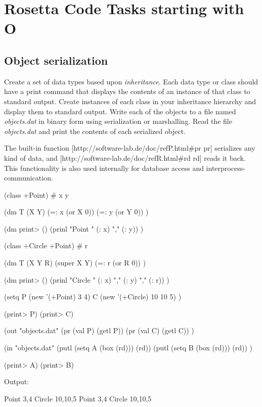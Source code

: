%
%
%

\chapter{Rosetta Code Tasks starting with O}

\section*{Object serialization}


Create a set of data types based upon
\emph{inheritance}. Each data type or class should
have a print command that displays the contents of an instance of that
class to standard output. Create instances of each class in your
inheritance hierarchy and display them to standard output. Write each of
the objects to a file named \emph{objects.dat} in binary form using
serialization or marshalling. Read the file \emph{objects.dat} and print
the contents of each serialized object.

\begin{wideverbatim}

The built-in function [http://software-lab.de/doc/refP.html#pr pr] serializes
any kind of data, and [http://software-lab.de/doc/refR.html#rd rd] reads it
back. This functionality is also used internally for database access and
interprocess-communication.

(class +Point)
# x y

(dm T (X Y)
   (=: x (or X 0))
   (=: y (or Y 0)) )

(dm print> ()
   (prinl "Point " (: x) "," (: y)) )

(class +Circle +Point)
# r

(dm T (X Y R)
   (super X Y)
   (=: r (or R 0)) )

(dm print> ()
   (prinl "Circle " (: x) "," (: y) "," (: r)) )

(setq
   P (new '(+Point) 3 4)
   C (new '(+Circle) 10 10 5) )

(print> P)
(print> C)

(out "objects.dat"
   (pr (val P) (getl P))
   (pr (val C) (getl C)) )

(in "objects.dat"
   (putl (setq A (box (rd))) (rd))
   (putl (setq B (box (rd))) (rd)) )

(print> A)
(print> B)

Output:

Point 3,4
Circle 10,10,5
Point 3,4
Circle 10,10,5

\end{wideverbatim}

